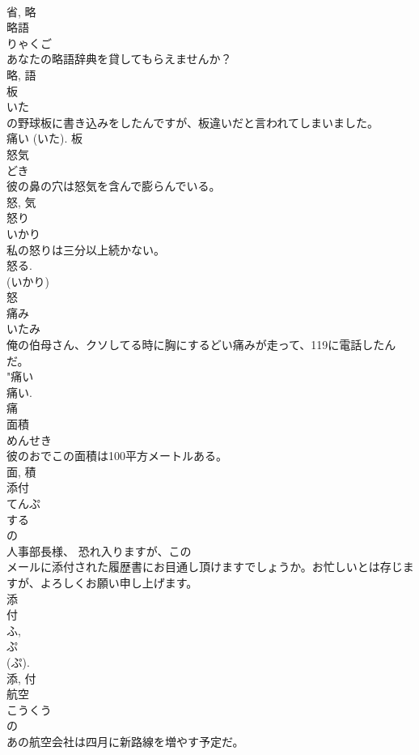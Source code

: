 \documentclass[8pt]{extreport}
\begin{document}
\begin{CJK}{UTF8}{min}
\\	省, 略	
\\	略語	
\\	りゃくご	
\\	あなたの略語辞典を貸してもらえませんか？	
\\	略, 語	
\\	板	
\\	いた	
\\	の野球板に書き込みをしたんですが、板違いだと言われてしまいました。	
\\	痛い (いた).	板	
\\	怒気	
\\	どき	
\\	彼の鼻の穴は怒気を含んで膨らんでいる。	
\\	怒, 気	
\\	怒り	
\\	いかり	
\\	私の怒りは三分以上続かない。	
\\	怒る. 
\\	(いかり) 
\\	怒	
\\	痛み	
\\	いたみ	
\\	俺の伯母さん、クソしてる時に胸にするどい痛みが走って、119に電話したんだ。	
\\	"痛い 
\\	痛い. 
\\	痛	
\\	面積	
\\	めんせき	
\\	彼のおでこの面積は100平方メートルある。	
\\	面, 積	
\\	添付	
\\	てんぷ	
\\	する 
\\	の 
\\	人事部長様、 恐れ入りますが、この
\\	メールに添付された履歴書にお目通し頂けますでしょうか。お忙しいとは存じますが、よろしくお願い申し上げます。	
\\	添 
\\	付 
\\	ふ, 
\\	ぷ 
\\	(ぷ). 
\\	添, 付	
\\	航空	
\\	こうくう	
\\	の 
\\	あの航空会社は四月に新路線を増やす予定だ。	

\end{CJK}
\end{document}
